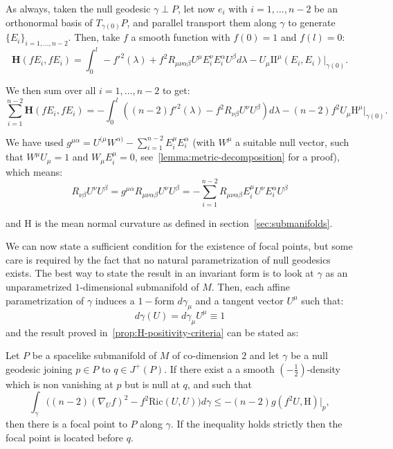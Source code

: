 As always, taken the null geodesic \(\gamma\perp P\), let now \(e_i\) with \(i = 1, \ldots, n - 2\) be an orthonormal basis of \(T_{\gamma(0)}P\), and parallel transport them along \(\gamma\) to generate \(\{E_i\}_{i = 1, \ldots, n-2}\). Then, take \(f\) a smooth function with \(f(0) = 1\) and \(f(l) = 0\):
\begin{equation*}
	\textbf{H}(fE_i, fE_i) = \int_{0}^{l} -f'^2(\lambda) + f^2R_{\mu\nu\alpha\beta}U^{\mu}E_i^{\nu}E_i^{\alpha}U^{\beta} d\lambda- U_{\mu}\mathrm{I\!I}^{\mu}(E_i, E_i)\Big\vert_{\gamma(0)}.
\end{equation*}

We then sum over all \(i = 1, \ldots, n - 2\) to get:
\begin{equation}
	\label{eq:hessian-averagded}
	\sum_{i=1}^{n - 2}\textbf{H}(fE_i, fE_i) = - \int_{0}^{l} \left((n - 2)f'^2(\lambda) - f^2R_{\nu\beta}U^{\nu}U^{\beta}\right) d\lambda - (n - 2)f^2U_{\mu}\mathrm{H}^{\mu}\Big\vert_{\gamma(0)}.
\end{equation}

We have used \(g^{\mu\alpha} = U^{(\mu}W^{\alpha)} - \sum_{i=1}^{n - 2}E_i^{\mu}E_i^{\alpha}\) (with \(W^{\mu}\) a suitable null vector, such that \(W^{\mu}U_{\mu} = 1\) and \(W_{\mu}E_i^{\mu} = 0\), see~\ref{lemma:metric-decomposition} for a proof), which means:
	\[
	R_{\nu\beta}U^{\nu}U^{\beta} = g^{\mu\alpha}R_{\mu\nu\alpha\beta}U^{\nu}U^{\beta} = - \sum_{i=1}^{n - 2}R_{\mu\nu\alpha\beta}E_i^{\mu}U^{\nu}E_i^{\alpha}U^{\beta}
	\]
	
	and \(\mathrm{H}\) is the mean normal curvature as defined in section~\ref{sec:submanifolds}.

	We can now state a sufficient condition for the existence of focal points, but some care is required by the fact that no natural parametrization of null geodesics exists.
	The best way to state the result in an invariant form is to look at \(\gamma\) as an unparametrized \(1\)-dimensional submanifold of \(M\).
	Then, each affine parametrization of \(\gamma\) induces a \(1-\)form \(d\gamma_{\mu}\) and a tangent vector \(U^{\mu}\) such that:
	\[
	d\gamma(U) = d\gamma_{\mu}U^{\mu} \equiv 1
	\]
	and the result proved in~\ref{prop:H-positivity-criteria} can be stated as:
	\begin{prop}
		\label{prop:fp-criteria}
		Let \(P\) be a spacelike submanifold of \(M\) of co-dimension \(2\) and let \(\gamma\) be a null geodesic joining \(p \in P\) to \(q\in J^+(P)\). If there exist a a smooth \((-\frac{1}{2})\)-density which is non vanishing at \(p\) but is null at \(q\), and such that
		\begin{equation}
		\label{eq:fp-criteria}
		\int_{\gamma} \big((n -2)(\nabla_Uf)^2 - f^2\text{Ric}(U, U) \big)d\gamma\le -(n -2) g(f^2 U, \mathrm{H})\Big\vert_{p},
		\end{equation}
		then there is a focal point to \(P\) along \(\gamma\). If the inequality holds strictly then the focal point is located before \(q\).
	\end{prop}

